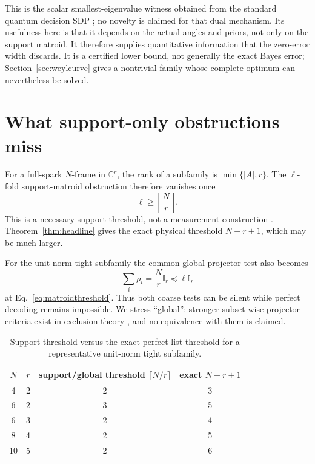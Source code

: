 \documentclass[11pt,a4paper]{article}
\newcommand{\C}{\mathbb{C}}
\newcommand{\I}{\mathbb{I}}
\begin{document}
This is the scalar smallest-eigenvalue witness obtained from the standard
quantum decision SDP \cite{Holevo1973,YuenKennedyLax1975}; no novelty is
claimed for that dual mechanism.  Its usefulness here is that it depends on
the actual angles and priors, not only on the support
matroid.  It therefore supplies quantitative information that the zero-error
width discards.  It is a certified lower bound, not generally the exact Bayes
error; Section~\ref{sec:weylcurve} gives a nontrivial family whose complete
optimum can nevertheless be solved.

\section{What support-only obstructions miss}

For a full-spark $N$-frame in $\C^r$, the rank of a subfamily is
$\min\{|A|,r\}$.  The $\ell$-fold support-matroid obstruction therefore
vanishes once
\begin{equation}\label{eq:matroidthreshold}
  \ell\ge\left\lceil\frac Nr\right\rceil.
\end{equation}
This is a necessary support threshold, not a measurement construction
\cite{ErikssonMatroidUnion2026}.  Theorem~\ref{thm:headline} gives the exact
physical threshold $N-r+1$, which may be much larger.

For the unit-norm tight subfamily the common global projector test also becomes
\[
  \sum_i\rho_i=\frac Nr\I_r\preceq\ell\I_r
\]
at Eq.~\eqref{eq:matroidthreshold}.  Thus both coarse tests can be silent while
perfect decoding remains impossible.  We stress ``global'': stronger
subset-wise projector criteria exist in exclusion theory
\cite{StrattonHsiehSkrzypczyk2024}, and no equivalence with them is claimed.

\begin{table}[t]
\centering
\caption{Support threshold versus the exact perfect-list threshold for a
representative unit-norm tight subfamily.}
\label{tab:gaps}
\begin{tabular}{cccc}
\toprule
$N$ & $r$ & support/global threshold $\lceil N/r\rceil$
& exact $N-r+1$\\
\midrule
4 & 2 & 2 & 3\\
6 & 2 & 3 & 5\\
6 & 3 & 2 & 4\\
8 & 4 & 2 & 5\\
10& 5 & 2 & 6\\
\bottomrule
\end{tabular}
\end{table}
\end{document}
